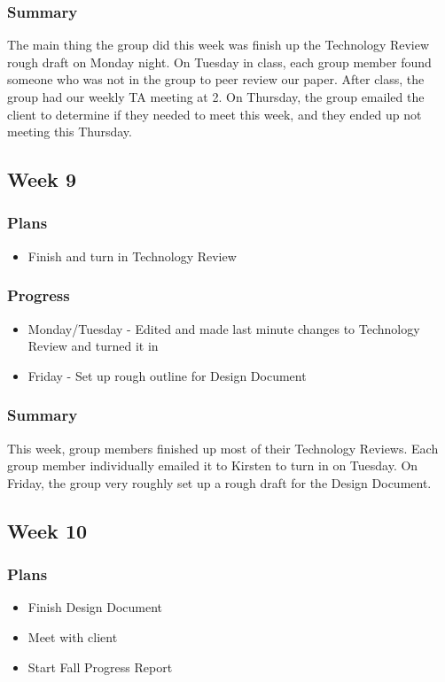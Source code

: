 \documentclass[onecolumn, draftclsnofoot,10pt, compsoc]{IEEEtran}
\begin{document}
\subsubsection{Summary}
The main thing the group did this week was finish up the Technology Review rough draft on Monday night. On Tuesday in class, each group member found someone who was not in the group to peer review our paper. After class, the group had our weekly TA meeting at 2. On Thursday, the group emailed the client to determine if they needed to meet this week, and they ended up not meeting this Thursday.
\subsection{Week 9}

\subsubsection{Plans}
\begin{itemize}
\item Finish and turn in Technology Review
\end{itemize}

\subsubsection{Progress}
\begin{itemize}
\item Monday/Tuesday - Edited and made last minute changes to Technology Review and turned it in
\item Friday - Set up rough outline for Design Document
\end{itemize}
\subsubsection{Summary}
This week, group members finished up most of their Technology Reviews. Each group member individually emailed it to Kirsten to turn in on Tuesday. On Friday, the group very roughly set up a rough draft for the Design Document.
\subsection{Week 10}

\subsubsection{Plans}
\begin{itemize}
\item Finish Design Document
\item Meet with client
\item Start Fall Progress Report

\end{itemize}
\end{document}
